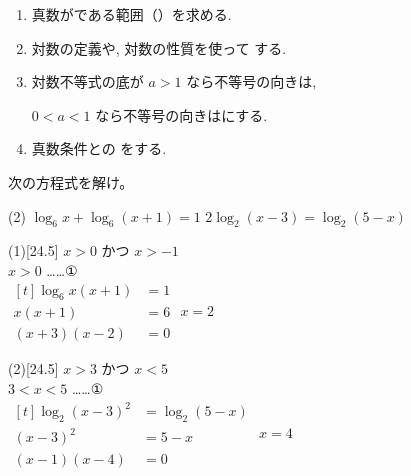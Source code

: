 \documentclass[14pt,dvipdfmx]{jsarticle}
\begin{document}
\vspace{0.3em}
\begin{summarybox}
  \begin{enumerate}[label=\textbf{\arabic*}, leftmargin=1.5zw, itemsep=0.06em]
    \item 真数がである範囲（）を求める.
    \item 対数の定義や, 対数の性質を使って する.
    \item 対数不等式の底が $a>1$ なら不等号の向きは,

    $0<a<1$ なら不等号の向きはにする.
    \item 真数条件との をする.
  \end{enumerate}
\end{summarybox}

\vfill
{}
\nextpage

\quad
次の方程式を解け。
\par\vspace{-0.22em}
\begin{tasks}[label=(\arabic*), label-width=1.6zw, item-indent=2zw, after-item-skip=0.04em](2)
  \task $\log_{6} x+\log_{6}(x+1)=1$
  \task $2\log_{2}(x-3)=\log_{2}(5-x)$
\end{tasks}
\vspace{0.04em}
\begin{answerbox}{(1)}[24.5]
  $x>0$ かつ $x>-1$ \\
  $x>0$ \quad ……①\\
  $\begin{aligned}[t]
    \log_{6} x(x+1) &= 1 \\
    x(x+1) &= 6 \\
    (x+3)(x-2) &= 0
  \end{aligned}$
   $x=2$
\end{answerbox}
\vspace{0.12em}
\begin{answerbox}{(2)}[24.5]
  $x>3$ かつ $x<5$ \\
  $3<x<5$ \quad ……①\\
  $\begin{aligned}[t]
    \log_{2}(x-3)^{2} &= \log_{2}(5-x) \\
    (x-3)^{2} &= 5-x \\
    (x-1)(x-4) &= 0
  \end{aligned}$
   $x=4$
\end{answerbox}
\end{document}
